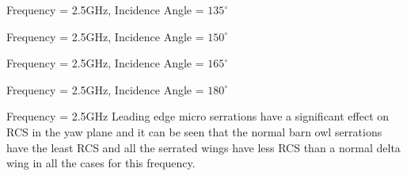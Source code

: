 \documentclass{beamer}
\begin{document}
\begin{frame}{Frequency = 2.5GHz, Incidence Angle = $135^\circ$}
	
\end{frame}

\begin{frame}{Frequency = 2.5GHz, Incidence Angle = $150^\circ$}
	
\end{frame}

\begin{frame}{Frequency = 2.5GHz, Incidence Angle = $165^\circ$}
	
\end{frame}

\begin{frame}{Frequency = 2.5GHz, Incidence Angle = $180^\circ$}
	
\end{frame}

\begin{frame}{Frequency = 2.5GHz}
\justifying
Leading edge micro serrations have a significant effect on RCS in the yaw plane and it can be seen that the normal barn owl serrations have the least RCS and all the serrated wings have less RCS than a normal delta wing in all the cases for this frequency.
\end{frame}
\end{document}
